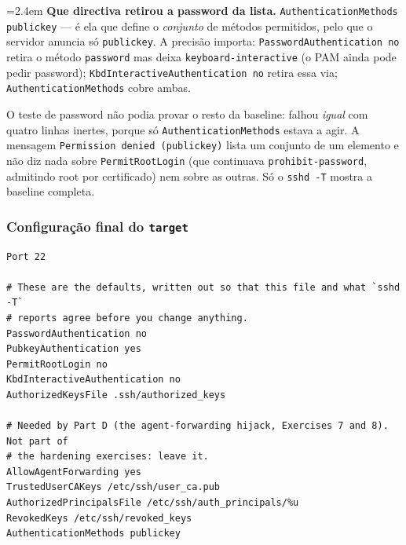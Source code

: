 \documentclass[a4paper,11pt]{article}
\newenvironment{answer}[1]{%
  \par\addvspace{7pt}\noindent
  \hangindent=2.4em\hangafter=1
  {\color{sscnblue}\bfseries #1\hspace{0.55em}}\ignorespaces}
  {\par\addvspace{5pt}}
\newcommand{\cmd}[1]{\textcolor{sscnblue}{\texttt{#1}}}
\begin{document}
\begin{answer}{Que directiva retirou a password da lista.}
\cmd{AuthenticationMethods publickey} --- \'e ela que define o \emph{conjunto} de m\'etodos
permitidos, pelo que o servidor anuncia s\'o \cmd{publickey}. A precis\~ao importa:
\cmd{PasswordAuthentication no} retira o m\'etodo \cmd{password} mas deixa
\cmd{keyboard-interactive} (o PAM ainda pode pedir password);
\cmd{KbdInteractiveAuthentication no} retira essa via; \cmd{AuthenticationMethods} cobre
ambas.

O teste de password n\~ao podia provar o resto da baseline: falhou \emph{igual} com
quatro linhas inertes, porque s\'o \cmd{AuthenticationMethods} estava a agir. A mensagem
\cmd{Permission denied (publickey)} lista um conjunto de um elemento e n\~ao diz nada sobre
\cmd{PermitRootLogin} (que continuava \cmd{prohibit-password}, admitindo root por
certificado) nem sobre as outras. S\'o o \cmd{sshd -T} mostra a baseline completa.
\end{answer}

\subsubsection{Configura\c{c}\~ao final do \cmd{target}}

\begin{lstlisting}
Port 22

# These are the defaults, written out so that this file and what `sshd -T`
# reports agree before you change anything.
PasswordAuthentication no
PubkeyAuthentication yes
PermitRootLogin no
KbdInteractiveAuthentication no
AuthorizedKeysFile .ssh/authorized_keys

# Needed by Part D (the agent-forwarding hijack, Exercises 7 and 8). Not part of
# the hardening exercises: leave it.
AllowAgentForwarding yes
TrustedUserCAKeys /etc/ssh/user_ca.pub
AuthorizedPrincipalsFile /etc/ssh/auth_principals/%u
RevokedKeys /etc/ssh/revoked_keys
AuthenticationMethods publickey
\end{lstlisting}
\end{document}
